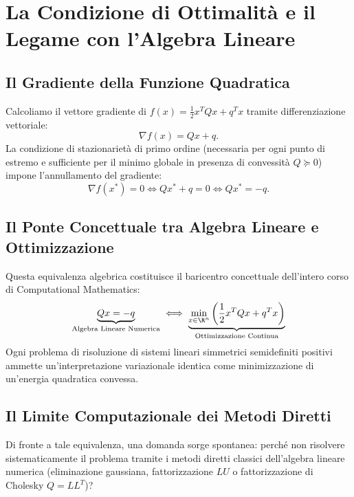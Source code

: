 \FloatBarrier
\section{La Condizione di Ottimalit\`a e il Legame con l'Algebra Lineare}
\label{sec:condizione-ottimalita-algebra-lineare}

\subsection{Il Gradiente della Funzione Quadratica}
Calcoliamo il vettore gradiente di $f(x) = \frac{1}{2} x^T Q x + q^T x$ tramite differenziazione vettoriale:
\begin{equation}
    \nabla f(x) = Qx + q.
\end{equation}
La condizione di stazionariet\`a di primo ordine (necessaria per ogni punto di estremo e sufficiente per il minimo globale in presenza di convessit\`a $Q \succeq 0$) impone l'annullamento del gradiente:
\begin{equation}
    \nabla f(x^*) = 0 \iff Q x^* + q = 0 \iff Q x^* = -q.
\end{equation}

\subsection{Il Ponte Concettuale tra Algebra Lineare e Ottimizzazione}
Questa equivalenza algebrica costituisce il baricentro concettuale dell'intero corso di Computational Mathematics:
\begin{equation}
    \underbrace{Qx = -q}_{\text{Algebra Lineare Numerica}} \iff \underbrace{\min_{x \in \R^n} \left(\frac{1}{2}x^T Qx + q^T x\right)}_{\text{Ottimizzazione Continua}}
\end{equation}
Ogni problema di risoluzione di sistemi lineari simmetrici semidefiniti positivi ammette un'interpretazione variazionale identica come minimizzazione di un'energia quadratica convessa.

\subsection{Il Limite Computazionale dei Metodi Diretti}
Di fronte a tale equivalenza, una domanda sorge spontanea: perch\'e non risolvere sistematicamente il problema tramite i metodi diretti classici dell'algebra lineare numerica (eliminazione gaussiana, fattorizzazione $LU$ o fattorizzazione di Cholesky $Q = L L^T$)?

